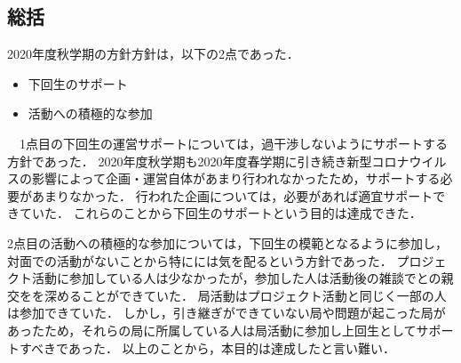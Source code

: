 \subsection*{\thirdGrade{}総括}


2020年度秋学期の\thirdGrade{}方針方針は，以下の2点であった．
\begin{itemize}
  \item 下回生のサポート
  \item 活動への積極的な参加
\end{itemize}
　1点目の下回生の運営サポートについては，過干渉しないようにサポートする方針であった．
2020年度秋学期も2020年度春学期に引き続き新型コロナウイルスの影響によって企画・運営自体があまり行われなかったため，サポートする必要があまりなかった．
行われた企画については，必要があれば適宜サポートできていた．
これらのことから下回生のサポートという目的は達成できた．

2点目の活動への積極的な参加については，下回生の模範となるように参加し，対面での活動がないことから特に\firstGrade{}には気を配るという方針であった．
プロジェクト活動に参加している人は少なかったが，参加した人は活動後の雑談で\firstGrade{}との親交をを深めることができていた．
局活動はプロジェクト活動と同じく一部の人は参加できていた．
しかし，引き継ぎができていない局や問題が起こった局があったため，それらの局に所属している人は局活動に参加し上回生としてサポートすべきであった．
以上のことから，本目的は達成したと言い難い．
